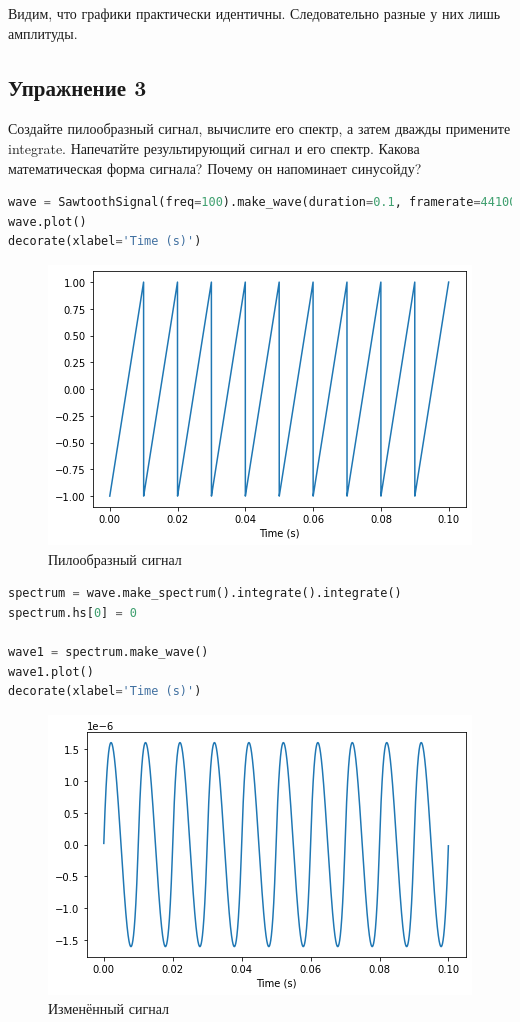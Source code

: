 Видим, что графики практически идентичны. Следовательно разные у них лишь амплитуды.

\subsection{Упражнение 3}

Создайте пилообразный сигнал, вычислите его спектр, а затем дважды примените integrate. Напечатйте результирующий сигнал и его спектр. Какова математическая форма сигнала? Почему он напоминает синусойду?

\begin{lstlisting}[language=Python]
wave = SawtoothSignal(freq=100).make_wave(duration=0.1, framerate=44100)
wave.plot()
decorate(xlabel='Time (s)')
\end{lstlisting}
\begin{figure}[H]
	\begin{center}
		\includegraphics[scale=1]{fig/lab09/lab09_21_0.png}
		\caption{Пилообразный сигнал}
	\end{center}
\end{figure}

\begin{lstlisting}[language=Python]
spectrum = wave.make_spectrum().integrate().integrate()
spectrum.hs[0] = 0

wave1 = spectrum.make_wave()
wave1.plot()
decorate(xlabel='Time (s)')
\end{lstlisting}
\begin{figure}[H]
	\begin{center}
		\includegraphics[scale=1]{fig/lab09/lab09_22_0.png}
		\caption{Изменённый сигнал}
	\end{center}
\end{figure}

